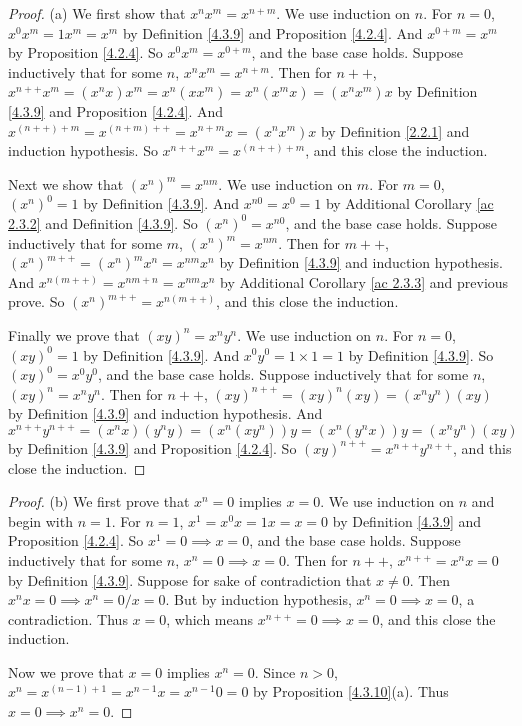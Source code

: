 \begin{proof}{(a)}
    We first show that \(x^n x^m = x^{n + m}\).
    We use induction on \(n\).
    For \(n = 0\), \(x^0 x^m = 1 x^m = x^m\) by Definition \ref{4.3.9} and Proposition \ref{4.2.4}.
    And \(x^{0 + m} = x^m\) by Proposition \ref{4.2.4}.
    So \(x^0 x^m = x^{0 + m}\), and the base case holds.
    Suppose inductively that for some \(n\), \(x^n x^m = x^{n + m}\).
    Then for \(n++\), \(x^{n++} x^m = (x^n x) x^m = x^n (x x^m) = x^n (x^m x) = (x^n x^m)x\) by Definition \ref{4.3.9} and Proposition \ref{4.2.4}.
    And \(x^{(n++) + m} = x^{(n + m)++} = x^{n + m} x = (x^n x^m)x\) by Definition \ref{2.2.1} and induction hypothesis.
    So \(x^{n++} x^m = x^{(n++) + m}\), and this close the induction.

    Next we show that \((x^n)^m = x^{nm}\).
    We use induction on \(m\).
    For \(m = 0\), \((x^n)^0 = 1\) by Definition \ref{4.3.9}.
    And \(x^{n0} = x^0 = 1\) by Additional Corollary \ref{ac 2.3.2} and Definition \ref{4.3.9}.
    So \((x^n)^0 = x^{n0}\), and the base case holds.
    Suppose inductively that for some \(m\), \((x^n)^m = x^{nm}\).
    Then for \(m++\), \((x^n)^{m++} = (x^n)^m x^n = x^{nm} x^n\) by Definition \ref{4.3.9} and induction hypothesis.
    And \(x^{n(m++)} = x^{nm + n} = x^{nm} x^n\) by Additional Corollary \ref{ac 2.3.3} and previous prove.
    So \((x^n)^{m++} = x^{n(m++)}\), and this close the induction.

    Finally we prove that \((xy)^n = x^n y^n\).
    We use induction on \(n\).
    For \(n = 0\), \((xy)^0 = 1\) by Definition \ref{4.3.9}.
    And \(x^0 y^0 = 1 \times 1 = 1\) by Definition \ref{4.3.9}.
    So \((xy)^0 = x^0 y^0\), and the base case holds.
    Suppose inductively that for some \(n\), \((xy)^n = x^n y^n\).
    Then for \(n++\), \((xy)^{n++} = (xy)^n (xy) = (x^n y^n)(xy)\) by Definition \ref{4.3.9} and induction hypothesis.
    And \(x^{n++} y^{n++} = (x^n x)(y^n y) = (x^n (x y^n))y = (x^n (y^n x))y = (x^n y^n)(xy)\) by Definition \ref{4.3.9} and Proposition \ref{4.2.4}.
    So \((xy)^{n++} = x^{n++} y^{n++}\), and this close the induction.
\end{proof}

\begin{proof}{(b)}
    We first prove that \(x^n = 0\) implies \(x = 0\).
    We use induction on \(n\) and begin with \(n = 1\).
    For \(n = 1\), \(x^1 = x^0 x = 1x = x = 0\) by Definition \ref{4.3.9} and Proposition \ref{4.2.4}.
    So \(x^1 = 0 \implies x = 0\), and the base case holds.
    Suppose inductively that for some \(n\), \(x^n = 0 \implies x = 0\).
    Then for \(n++\), \(x^{n++} = x^n x = 0\) by Definition \ref{4.3.9}.
    Suppose for sake of contradiction that \(x \neq 0\).
    Then \(x^n x = 0 \implies x^n = 0 / x = 0\).
    But by induction hypothesis, \(x^n = 0 \implies x = 0\), a contradiction.
    Thus \(x = 0\), which means \(x^{n++} = 0 \implies x = 0\), and this close the induction.

    Now we prove that \(x = 0\) implies \(x^n = 0\).
    Since \(n > 0\), \(x^n = x^{(n - 1) + 1} = x^{n - 1} x = x^{n - 1} 0 = 0\) by Proposition \ref{4.3.10}(a).
    Thus \(x = 0 \implies x^n = 0\).
\end{proof}

